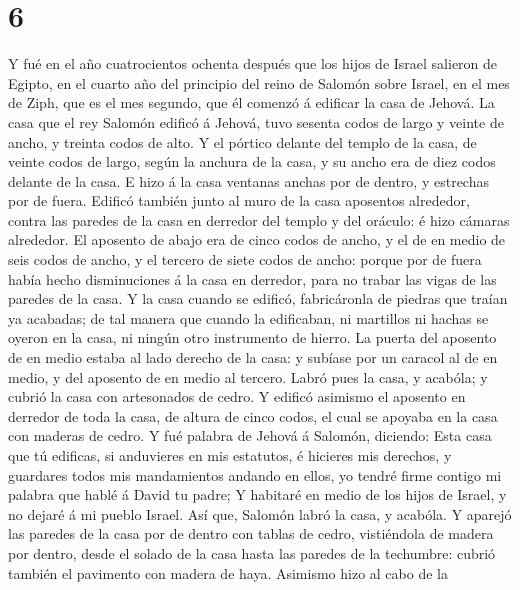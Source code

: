 \hypertarget{section-5}{%
\section{6}\label{section-5}}

 Y fué en el año cuatrocientos ochenta después que los hijos
de Israel salieron de Egipto, en el cuarto año del principio del reino
de Salomón sobre Israel, en el mes de Ziph, que es el mes segundo, que
él comenzó á edificar la casa de Jehová.  La casa que el rey
Salomón edificó á Jehová, tuvo sesenta codos de largo y veinte de ancho,
y treinta codos de alto.  Y el pórtico delante del templo de
la casa, de veinte codos de largo, según la anchura de la casa, y su
ancho era de diez codos delante de la casa.  E hizo á la
casa ventanas anchas por de dentro, y estrechas por de fuera.
 Edificó también junto al muro de la casa aposentos
alrededor, contra las paredes de la casa en derredor del templo y del
oráculo: é hizo cámaras alrededor.  El aposento de abajo era
de cinco codos de ancho, y el de en medio de seis codos de ancho, y el
tercero de siete codos de ancho: porque por de fuera había hecho
disminuciones á la casa en derredor, para no trabar las vigas de las
paredes de la casa.  Y la casa cuando se edificó,
fabricáronla de piedras que traían ya acabadas; de tal manera que cuando
la edificaban, ni martillos ni hachas se oyeron en la casa, ni ningún
otro instrumento de hierro.  La puerta del aposento de en
medio estaba al lado derecho de la casa: y subíase por un caracol al de
en medio, y del aposento de en medio al tercero.  Labró pues
la casa, y acabóla; y cubrió la casa con artesonados de cedro.
 Y edificó asimismo el aposento en derredor de toda la
casa, de altura de cinco codos, el cual se apoyaba en la casa con
maderas de cedro.  Y fué palabra de Jehová á Salomón,
diciendo:  Esta casa que tú edificas, si anduvieres en mis
estatutos, é hicieres mis derechos, y guardares todos mis mandamientos
andando en ellos, yo tendré firme contigo mi palabra que hablé á David
tu padre;  Y habitaré en medio de los hijos de Israel, y no
dejaré á mi pueblo Israel.  Así que, Salomón labró la casa,
y acabóla.  Y aparejó las paredes de la casa por de dentro
con tablas de cedro, vistiéndola de madera por dentro, desde el solado
de la casa hasta las paredes de la techumbre: cubrió también el
pavimento con madera de haya.  Asimismo hizo al cabo de la
